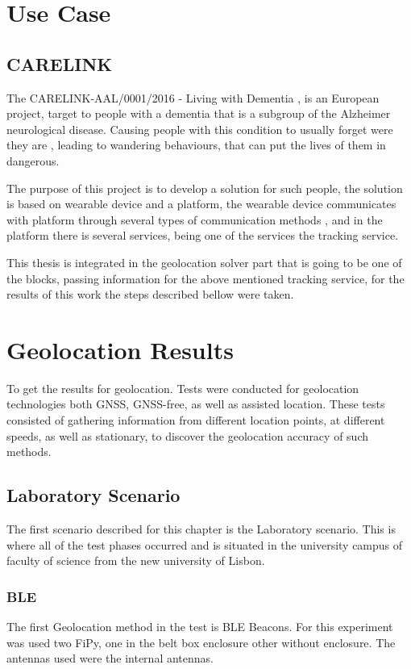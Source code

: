 \section{Use Case}
\label{sec:Use_case}
\subsection{CARELINK} %
\label{sec:Use_case_CARELINK}
The CARELINK-AAL/0001/2016 - Living with Dementia , is an European project, target to people with a dementia that is a subgroup of the Alzheimer neurological disease.
Causing people with this condition to usually forget were they are , leading to wandering behaviours, that can put the lives of them in dangerous.

The purpose of this project is to develop a solution for such people, the solution is based on wearable device and a platform, the wearable device communicates with platform through several types of communication methods , and in the platform there is several services, being one of the services the tracking service. 

This thesis is integrated in the geolocation solver part that is going to be one of the blocks, passing information for the above mentioned tracking service, for the results of this work  the steps described bellow were taken.
\newpage


\section{Geolocation Results}
\label{sec:Geolocation_Results}
 To get the results for geolocation. Tests were conducted for geolocation technologies both GNSS, GNSS-free, as well as assisted location. These tests consisted of gathering information from different location points, at different speeds, as well as stationary, to discover the geolocation accuracy of such methods. 

\subsection{Laboratory Scenario}
\label{subsec:laboratory}
The first scenario described for this chapter is the Laboratory scenario. This is where all of the test phases occurred and is situated in the university campus of faculty of science from the new university of Lisbon.

\subsubsection{BLE}
\label{subsubsec:Geo_BLE}
The first  Geolocation method in the test is BLE Beacons. For this experiment was used two FiPy, one in the belt box enclosure other without enclosure. The antennas used were the internal antennas. 

